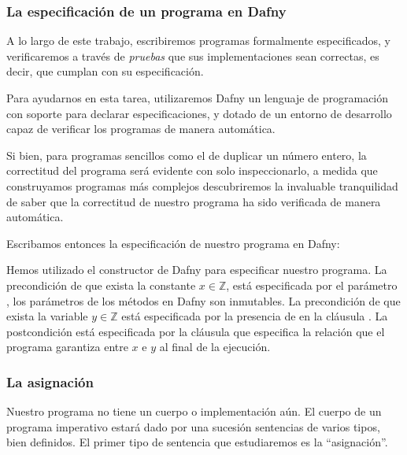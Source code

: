 \documentclass[12pt, a4paper, openany, fleqn]{book}
\begin{document}
    \subsubsection*{La especificación de un programa en Dafny}

    A lo largo de este trabajo, escribiremos programas formalmente especificados, y verificaremos a través de \textit{pruebas} que sus implementaciones sean correctas, es decir, que cumplan con su especificación.

    Para ayudarnos en esta tarea, utilizaremos Dafny un lenguaje de programación con soporte para declarar especificaciones, y dotado de un entorno de desarrollo capaz de verificar los programas de manera automática.

    Si bien, para programas sencillos como el de duplicar un número entero, la correctitud del programa será evidente con solo inspeccionarlo, a medida que construyamos programas más complejos descubriremos la invaluable tranquilidad de saber que la correctitud de nuestro programa ha sido verificada de manera automática.

    Escribamos entonces la especificación de nuestro programa en Dafny:


    Hemos utilizado el constructor  de Dafny para especificar nuestro programa. La precondición de que exista la constante \begin{math}x \in \mathbb{Z}\end{math}, está especificada por el parámetro , los parámetros de los métodos en Dafny son inmutables. La precondición de que exista la variable \begin{math}y \in \mathbb{Z}\end{math} está especificada por la presencia de  en la cláusula .
    La postcondición está especificada por la cláusula  que especifica la relación que el programa garantiza entre $x$ e $y$ al final de la ejecución.

    \subsubsection*{La asignación}
    Nuestro programa no tiene un cuerpo o implementación aún. El cuerpo de un programa imperativo estará dado por una sucesión sentencias de varios tipos, bien definidos. El primer tipo de sentencia que estudiaremos es la ``asignación''.
\end{document}
